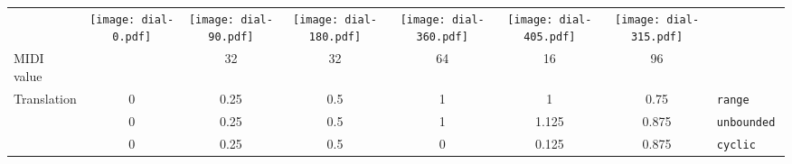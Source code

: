 \documentclass[11pt,a4paper]{article}
\newenvironment{expose}{\vskip3mm\qquad\begin{raggedright}}{%
\end{raggedright}\vskip3mm}
\begin{document}
\begin{expose}
\begin{tabular}{lccccccl}
  \raisebox{6mm}{User input} &
  \texttt{[image: dial-0.pdf]} &
  \texttt{[image: dial-90.pdf]} &
  \texttt{[image: dial-180.pdf]} &
  \texttt{[image: dial-360.pdf]} &
  \texttt{[image: dial-405.pdf]} &
  \texttt{[image: dial-315.pdf]} \\
  \cmidrule(r){1-7}
  MIDI value &
  & 32 & 32 & 64 & 16 & 96 \\
  \midrule
  Translation
  & 0 & 0.25 & 0.5 & 1 & 1 & 0.75 & \tt range \\
  & 0 & 0.25 & 0.5 & 1 & 1.125 & 0.875 & \tt unbounded \\
  & 0 & 0.25 & 0.5 & 0 & 0.125 & 0.875 & \tt cyclic \\
\end{tabular}
\end{expose}

\end{document}
